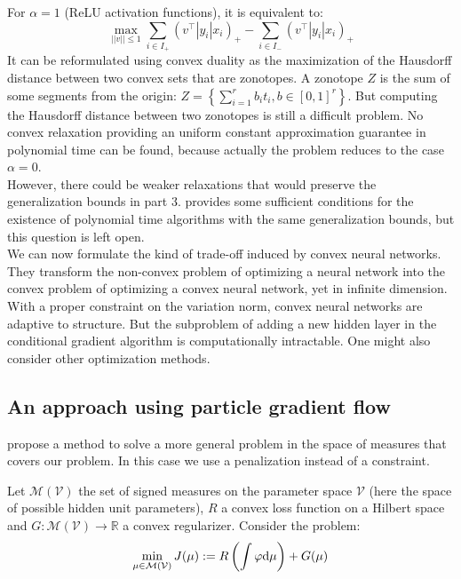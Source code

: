 \documentclass[a4paper, 11pt]{scrartcl}
\begin{document}
{For $\alpha = 1$ (ReLU activation functions), it is equivalent to:
\begin{equation}
\max_{||v|| \leq 1} \sum_{i\in I_+} (v^\top |y_i| x_i )_+  - \sum_{i\in I_-} (v^\top |y_i| x_i )_+
\end{equation}
It can be reformulated using convex duality as the maximization of the Hausdorff distance between two convex sets that are zonotopes. A zonotope $Z$ is the sum of some segments from the origin: $Z = \left\{ \sum_{i=1}^r b_i t_i, b \in [0, 1]^r \right\}$. But computing the Hausdorff distance between two zonotopes is still a difficult problem. No convex relaxation providing an uniform constant approximation guarantee in polynomial time can be found, because actually the problem reduces to the case $\alpha = 0$.\\

However, there could be weaker relaxations that would preserve the generalization bounds in part 3. \cite{bach2017breaking} provides some sufficient conditions for the existence of polynomial time algorithms with the same generalization bounds, but this question is left open.\\

We can now formulate the kind of trade-off induced by convex neural networks. They transform the non-convex problem of optimizing a neural network into the convex problem of optimizing a convex neural network, yet in infinite dimension. With a proper constraint on the variation norm, convex neural networks are adaptive to structure. But the subproblem of adding a new hidden layer in the conditional gradient algorithm is computationally intractable. One might also consider other optimization methods.


\subsection{An approach using particle gradient flow}

\cite{chizat2018global} propose a method to solve a more general problem in the space of measures that covers our problem. In this case we use a penalization instead of a constraint.

Let $\mathcal{M}(\mathcal{V})$ the set of signed measures on the parameter space $\mathcal{V}$ (here the space of possible hidden unit parameters), $R$ a convex loss function on a Hilbert space and $G:\mathcal{M}(\mathcal{V}) \rightarrow \mathbb{R}$ a convex regularizer. Consider the problem:
\begin{equation}
\min_{\mu \in \mathcal{M}(\mathcal{V})} J(\mu):=R\left( \int \varphi \textnormal{d}\mu \right) + G(\mu)
\end{equation}

}
\end{document}
